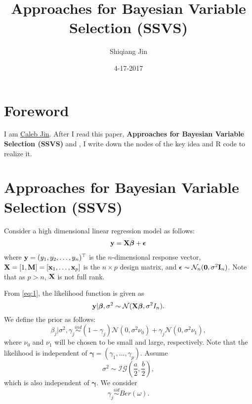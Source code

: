 \documentclass[]{book}
\title{Approaches for Bayesian Variable Selection (SSVS)}
\author{Shiqiang Jin}
\date{4-17-2017}
\begin{document}
\maketitle

{
\setcounter{tocdepth}{1}
\tableofcontents
}
\hypertarget{foreword}{%
\chapter{Foreword}\label{foreword}}

I am \href{https://www.sjin.name/}{Caleb Jin}. After I read this paper, \textbf{Approaches for Bayesian Variable Selection (SSVS)}\citep{George1997} and \citep{George1993}, I write down the nodes of the key idea and R code to realize it.

\newcommand\T{{\top}}
\newcommand\ubeta{{\boldsymbol \beta}}
\newcommand\uSigma{{\boldsymbol \Sigma}}
\newcommand\uepsilon{{\boldsymbol \epsilon}}
\newcommand\umu{{\boldsymbol \mu}}
\newcommand\utheta{{\boldsymbol \theta}}
\newcommand\bg{{\boldsymbol \gamma}}
\newcommand\0{{\bf 0}}
\newcommand\uX{{\bf X}}
\newcommand\uD{{\bf D}}
\newcommand\ux{{\bf x}}
\newcommand\uY{{\bf Y}}
\newcommand\uy{{\bf y}}
\newcommand\uz{{\bf z}}
\newcommand\uI{{\bf I}}
\newcommand\uA{{\bf A}}
\newcommand\uB{{\bf B}}
\newcommand\uH{{\bf H}}
\newcommand\uM{{\bf M}}
\newcommand\uV{{\bf V}}
\newcommand\diag{{\rm diag}}

\hypertarget{approaches-for-bayesian-variable-selection-ssvs}{%
\chapter{Approaches for Bayesian Variable Selection (SSVS)}\label{approaches-for-bayesian-variable-selection-ssvs}}

Consider a high dimensional linear regression model as follows:
\begin{eqnarray}
{\bf y}={\bf X}{\boldsymbol \beta}+ {\boldsymbol \epsilon}
\label{eq:1}
\end{eqnarray}
where \({\bf y}=(y_1,y_2,\ldots,y_{n})^{{\top}}\) is the \(n\)-dimensional response vector, \({\bf X}=[1,{\bf M}]=[{\bf x}_1,\ldots,{\bf x}_{p}]\) is the \(n\times p\) design
matrix, and \({\boldsymbol \epsilon}\sim \mathcal{N}_{n}({\bf 0},\sigma^2{\bf I}_{n})\). Note that as \(p>n\), \({\bf X}\) is not full rank.

From \eqref{eq:1}, the likelihood function is given as
\[
{\bf y}|{\boldsymbol \beta}, \sigma^2 \sim \mathcal{N}({\bf X}{\boldsymbol \beta}, \sigma^2I_n).
\]
We define the prior as follows:
\[
\beta_j|\sigma^2,\gamma_j \stackrel{ind}{\sim} (1-\gamma_j) \mathcal{N}(0, \sigma^2\nu_0) + \gamma_j\mathcal{N}(0,\sigma^2\nu_1),
\]
where \(\nu_0\) and \(\nu_1\) will be chosen to be small and large, respectively. Note that the likelihood is independent of \({\boldsymbol \gamma}=(\gamma_1,\ldots,\gamma_p)\).
Assume
\[
\sigma^2 \sim \mathcal{IG}(\frac{a}{2}, \frac{b}{2}),
\]
which is also independent of \({\boldsymbol \gamma}\). We consider
\[
\gamma_j \stackrel{iid}{\sim} Ber(\omega).
\]
\end{document}
